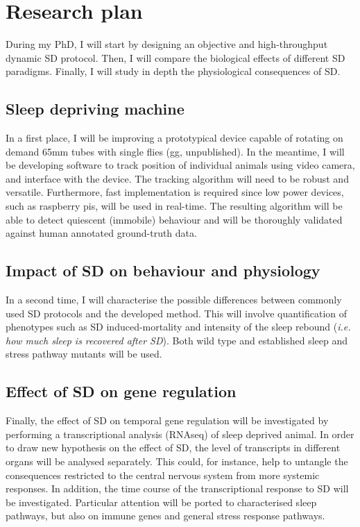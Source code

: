 \section{Research plan}

During my PhD, I will start by designing an objective and high-throughput dynamic SD protocol. 
Then, I will compare the biological effects of different SD paradigms.
Finally, I will study in depth the physiological consequences of SD.

\subsection{Sleep depriving machine}

In a first place, I will be improving a prototypical device capable of rotating on demand 65mm tubes with single flies (gg, unpublished). 
In the meantime, I will be developing software to track position of individual animals using video camera, and interface with the device. 
The tracking algorithm will need to be robust and versatile. 
Furthermore, fast implementation is required since low power devices, such as raspberry pis, will be used in real-time.
The resulting algorithm will be able to detect quiescent (immobile) behaviour and will be thoroughly validated against human annotated ground-truth data.

\subsection{Impact of SD on behaviour and physiology}

In a second time, I will characterise the possible differences between commonly used SD protocols and the developed method.
This will involve quantification of phenotypes such as SD induced-mortality and intensity of the sleep rebound (\emph{i.e. how much sleep is recovered after SD}). 
Both wild type and established sleep and stress pathway mutants will be used.


\subsection{Effect of SD on gene regulation}

Finally, the effect of SD on temporal gene regulation will be investigated by performing a transcriptional analysis (RNAseq) of sleep deprived animal. In order to draw new hypothesis on the effect of SD, the level of transcripts in different organs will be analysed separately. 
This could, for instance, help to untangle the consequences restricted to the central nervous system from more systemic responses.
In addition, the time course of the transcriptional response to SD will be investigated.
Particular attention will be ported to characterised sleep pathways, but also on immune genes and general stress response pathways.
